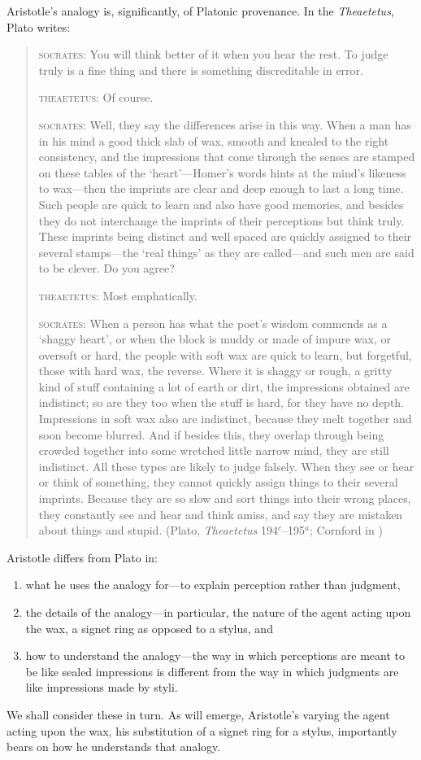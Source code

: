Aristotle's analogy is, significantly, of Platonic provenance. In the \emph{Theaetetus}, Plato writes:
\begin{quotation}
	\textsc{socrates}: You will think better of it when you hear the rest. To judge truly is a fine thing and there is something discreditable in error.
	
	\textsc{theaetetus}: Of course.
	
	\textsc{socrates}: Well, they say the differences arise in this way. When a man has in his mind a good thick slab of wax, smooth and knealed to the right consistency, and the impressions that come through the senses are stamped on these tables of the `heart'---Homer's words hints at the mind's likeness to wax---then the imprints are clear and deep enough to last a long time. Such people are quick to learn and also have good memories, and besides they do not interchange the imprints of their perceptions but think truly. These imprints being distinct and well spaced are quickly assigned to their several stamps---the `real things' as they are called---and such men are said to be clever. Do you agree?
	
	\textsc{theaetetus}: Most emphatically.
	
	\textsc{socrates}: When a person has what the poet's wisdom commends as a `shaggy heart', or when the block is muddy or made of impure wax, or oversoft or hard, the people with soft wax are quick to learn, but forgetful, those with hard wax, the reverse. Where it is shaggy or rough, a gritty kind of stuff containing a lot of earth or dirt, the impressions obtained are indistinct; so are they too when the stuff is hard, for they have no depth. Impressions in soft wax also are indistinct, because they melt together and soon become blurred. And if besides this, they overlap through being crowded together into some wretched little narrow mind, they are still indistinct. All these types are likely to judge falsely. When they see or hear or think of something, they cannot quickly assign things to their several imprints. Because they are so slow and sort things into their wrong places, they constantly see and hear and think amiss, and say they are mistaken about things and stupid. (Plato, \emph{Theaetetus} 194\( ^{c} \)--195\( ^{a} \); Cornford in \citealt{Hamilton:1961fk})
\end{quotation}
Aristotle differs from Plato in:
\begin{enumerate}[(1)]
	\item what he uses the analogy for---to explain perception rather than judgment,
	\item the details of the analogy---in particular, the nature of the agent acting upon the wax, a signet ring as opposed to a stylus, and
	\item how to understand the analogy---the way in which perceptions are meant to be like sealed impressions is different from the way in which judgments are like impressions made by styli.
\end{enumerate}
We shall consider these in turn. As will emerge, Aristotle's varying the agent acting upon the wax, his substitution of a signet ring for a stylus, importantly bears on how he understands that analogy.

